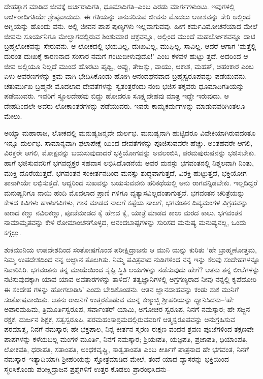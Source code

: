 ದೇಹತ್ಯಾಗ ಮಾಡಿದ ಜೀವಕ್ಕೆ ಅರ್ಚಿರಾದಿಗತಿ, ಧೂಮಾದಿಗತಿ–ಎಂಬ ಎರಡು ಮಾರ್ಗಗಳುಂಟು. ಇವುಗಳಲ್ಲಿ ಅರ್ಚಿರಾದಿಗತಿಯೇ ಶ್ರೇಷ್ಠವಾದುದು. ಈ ಗತಿಯನ್ನು ಅನುಸರಿಸುವ ಜೀವನು ಮೊದಲು ಆಕಾಶವನ್ನು ಸೇರಿ ಅಲ್ಲಿಂದ ಅಗ್ನಿಯನ್ನು ಹೊಂದು ವನು. ಅಲ್ಲಿ ಜೀವನ ಪಾಪ ಪುಣ್ಯಗಳು ಇಲ್ಲವಾಗುವವು. ಹೀಗೆ ಕರ್ಮವಿಮೋಚನೆಯಾದ ಮೇಲೆ ಜೀವನು ಸೂರ್ಯನಿಗೂ ಮೇಲ್ಭಾಗದಲ್ಲಿರುವ ಶಿಂಶುಮಾರ ಚಕ್ರವನ್ನೂ, ಅಲ್ಲಿಂದ ಮುಂದೆ ಮಹರ್ಲೋಕವನ್ನೂ ದಾಟಿ ಬ್ರಹ್ಮಲೋಕವನ್ನು ಸೇರುವನು. ಆ ಲೋಕದಲ್ಲಿ ಭಯವಿಲ್ಲ, ದುಃಖವಿಲ್ಲ, ಮುಪ್ಪಿಲ್ಲ, ಸಾವಿಲ್ಲ. ಆದರೆ ಆಗಾಗ ‘ಮತ್ತೆಲ್ಲಿ ದುರಂತ ದುಃಖಕ್ಕೆ ಕಾರಣನಾದ ಸಂಸಾರ ನಮಗೆ ಗಂಟುಬೀಳುವುದೊ!’ ಎಂಬ ಕಳವಳ ಹುಟ್ಟು ತ್ತದೆ. ಅದರಿಂದ ಆ ಜೀವ ಅಲ್ಲಿಯೂ ನಿಲ್ಲದೆ ಮುಂದೆ ಹೊರಟು ಪೃಥ್ವಿ, ಅಪ್ಪು, ತೇಜಸ್ಸು, ವಾಯು, ಆಕಾಶ, ಮಹತ್, ಅಹಂಕಾರ ಎಂಬ ಏಳು ಆವರಣಗಳನ್ನು ಕ್ರಮ ವಾಗಿ ಭೇದಿಸಿಕೊಂಡು ಹೋಗಿ ಆನಂದಘನವಾದ ಬ್ರಹ್ಮಸ್ವರೂಪವನ್ನು ಪಡೆಯುವನು. ಚತುರ್ಮುಖ ಬ್ರಹ್ಮನೇ ಮೊದಲಾದ ದೇವತೆಗಳನ್ನು ಸ್ವತಂತ್ರರೆಂದು ನಂಬಿ ಭಜಿಸ ತಕ್ಕವರು ಧೂಮಾದಿಗತಿಯನ್ನು ಪಡೆಯುವರು. ಇವರಿಗೆ ಸ್ಥೂಲದೇಹವು ಬಿದ್ದು ಹೋದರೂ ಸೂಕ್ಷ್ಮದೇಹವು ಮಾತ್ರ ಇದ್ದೇ ಇರುವುದು. ಆ ದೇಹದಿಂದಲೇ ಅವರು ಲೋಕಾಂತರಗಳನ್ನು ಪಡೆಯುವರು. ಇವರು ಕಾಮ್ಯಕರ್ಮಗಳನ್ನು ಮಾಡುವವರಿಗಿಂತಲೂ ಮೇಲು.

ಅಯ್ಯಾ ಮಹಾರಾಜ, ಲೋಕದಲ್ಲಿ ಮನುಷ್ಯಜನ್ಮವೇ ದುರ್ಲಭ. ಮನುಷ್ಯನಾಗಿ ಹುಟ್ಟಿದರೂ ವಿವೇಕಿಯಾಗಿರುವದಂತೂ ಇನ್ನೂ ದುರ್ಲಭ. ಸಾಮಾನ್ಯವಾಗಿ ಫಲಾಪೇಕ್ಷೆ ಯಿಂದ ದೇವತೆಗಳನ್ನು ಪೂಜಿಸುವವರೇ ಹೆಚ್ಚು. ಅಂತಹವರೇ ಆಗಲಿ, ವಿರಕ್ತರೇ ಆಗಲಿ, ಮೋಕ್ಷವನ್ನು ಬಯಸುವುದಾದರೆ ಭಕ್ತಿಯೋಗವನ್ನು ಅವಲಂಬಿಸಿ, ಪರಮಪುರುಷನನ್ನು ಭಜಿಸಬೇಕು. ಹಾಗೆ ಭಜಿಸುವವರಿಗೆ ಭಗವದ್ಭಕ್ತರ ಸಹವಾಸ ಲಭಿಸಿದೊಡನೆಯೆ ಅವರ ಮನಸ್ಸು ಭಗವಂತನಲ್ಲಿ ನಿಶ್ಚಲವಾಗಿ ನಿಂತು, ಮುಕ್ತಿ ದೊರೆಯುತ್ತದೆ. ಭಗವಂತನ ಸಂಕೀರ್ತನದಿಂದ ಮನಸ್ಸು ಶುದ್ಧವಾಗುತ್ತದೆ, ವಿರಕ್ತಿ ಹುಟ್ಟುತ್ತದೆ, ಭಕ್ತಿಯೋಗ ತಾನಾಗಿಯೇ ಲಭಿಸುತ್ತದೆ. ಆದ್ದರಿಂದ ಸುಖವನ್ನು ಬಯಸುವವನು ಹರಿಕಥೆಯಲ್ಲಿ ಅನು ರಾಗವನ್ನಿಡಬೇಕು. ಇಲ್ಲದಿದ್ದರೆ ಮನುಷ್ಯನಿಗೂ ನಾಯಿ ಹಂದಿ ಮೊದಲಾದ ಪ್ರಾಣಿ ಗಳಿಗೂ ವ್ಯತ್ಯಾಸವಿಲ್ಲದಂತಾಗುತ್ತದೆ. ಭಗವಂತನ ಚರಿತ್ರೆಯನ್ನು ಕೇಳದ ಕಿವಿಗಳು ಹಾಳುಗವಿಗಳು, ಗಾನ ಮಾಡದ ನಾಲಗೆ ಕಪ್ಪೆಯ ನಾಲಗೆ, ಭಗವಂತನ ದಿವ್ಯಮಂಗಳ ವಿಗ್ರಹವನ್ನು ಕಾಣದ ಕಣ್ಣು ನವಿಲಕಣ್ಣು, ಪೂಜೆಮಾಡದ ಕೈ ಹೆಣದ ಕೈ, ಯಾತ್ರೆ ಮಾಡದ ಕಾಲು ಮರದ ಕಾಲು. ಭಗವಂತನ ನಾಮಾಮೃತವನ್ನು ಕೇಳಿ ರೋಮಾಂಚನಗೊಳ್ಳದ, ಆನಂದಬಾಷ್ಪಗಳನ್ನು ಸುರಿಸದ ಮನುಷ್ಯ ಮನುಷ್ಯನಲ್ಲ, ಒಂದು ಕಗ್ಗಲ್ಲು.

ಶುಕಮುನಿಯ ಉಪದೇಶದಿಂದ ಸಂತೋಷಗೊಂಡ ಪರೀಕ್ಷಿದ್ರಾಜನು ಆ ಮುನಿ ಯನ್ನು ಕುರಿತು ‘ಹೇ ಬ್ರಾಹ್ಮಣೋತ್ತಮ, ನಿಮ್ಮ ಉಪದೇಶದಿಂದ ನನ್ನ ಅಜ್ಞಾನ ತೊಲಗಿತು. ನಿಮ್ಮ ಪವಿತ್ರವಾದ ನುಡಿಗಳಿಂದ ನನ್ನ ಇನ್ನು ಕೆಲವು ಸಂದೇಹಗಳನ್ನೂ ನಿವಾರಿಸಿರಿ. ಭಗವಂತನು ತನ್ನ ಮಾಯೆಯಿಂದ ಸೃಷ್ಟಿ ಸ್ಥಿತಿ ಲಯಗಳನ್ನು ನಡೆಸುವುದು ಹೇಗೆ? ಆತನು ತನ್ನ ಲೀಲೆಗಳನ್ನು ನಟಿಸುವುದಕ್ಕಾಗಿ ಯಾವ ಯಾವ ಅವತಾರಗಳನ್ನು ತಾಳಿದ? ತತ್ವಜ್ಞಾನಿಗಳಲ್ಲಿ ಅಗ್ರಗಣ್ಯರಾದ ನೀವು ನನ್ನಲ್ಲಿ ಕೃಪೆದೋರಿ ಈ ಸಂದೇಹ ಗಳನ್ನು ಹೋಗಲಾಡಿಸಿ’ ಎಂದು ಬೇಡಿಕೊಂಡನು. ಆತನ ಜ್ಞಾನದಾಹವನ್ನು ಕಂಡು ಶುಕ ಮುನಿಗೆ ಸಂತೋಷವಾಯಿತು. ಆತನು ರಾಜನಿಗೆ ಉತ್ತರಕೊಡುವ ಮುನ್ನ ಕಣ್ಮುಚ್ಚಿ ಶ್ರೀಹರಿಯನ್ನು ಧ್ಯಾನಿಸಿದನು–‘ಹೇ ಅಪಾರಮಹಿಮ, ತ್ರಿಮೂರ್ತಿಸ್ವರೂಪ, ಸರ್ವಾಂತರ್ ಯಾಮಿ, ಅಗೋಚರ ಸ್ವರೂಪ, ನಿನಗೆ ನಮಸ್ಕಾರ; ಹೇ ಸಜ್ಜನ ರಕ್ಷಕ, ದುರ್ಜನ ಶಿಕ್ಷಕ, ಸತ್ವಸ್ವರೂಪಿ, ಪರಮಹಂಸಾಶ್ರಮದಲ್ಲಿರುವವರಿಗೆ ಆತ್ಮಸ್ವರೂಪವನ್ನು ಅನುಗ್ರಹಿಸುವ ಪರಮಾತ್ಮ, ನಿನಗೆ ನಮಸ್ಕಾರ; ಹೇ ಭಕ್ತಪಾಲ, ನಿನ್ನ ಕೀರ್ತನ ಸ್ಮರಣ ಈಕ್ಷಣ ವಂದನ ಶ್ರವಣ ಪೂಜೆಗಳಿಂದ ತಕ್ಷಣವೇ ಪಾಪಗಳನ್ನು ಕಳೆಯಬಲ್ಲ ಮಂಗಳ ಮೂರ್ತಿ, ನಿನಗೆ ನಮಸ್ಕಾರ; ಶ್ರಿಯಃಪತಿ, ಯಜ್ಞಪತಿ, ಪ್ರಜಾಪತಿ, ಧಿಯಾಂಪತಿ, ಲೋಕಪತಿ, ಧರಾಪತಿ, ಸತಾಂಪತಿ, ಅಂಧಕವೃಷ್ಣಿ, ಸಾತ್ವತಾಂಪತಿ ಎಂಬ ಕೀರ್ತಿಗೆ ಪಾತ್ರನಾದ ಹೇ ಭಗವಂತ, ನಿನಗೆ ನಮಸ್ಕಾರ–ಇತ್ಯಾದಿಯಾಗಿ ಶ್ರೀಹರಿಯನ್ನು ಸ್ತೋತ್ರಮಾಡಿದ ಮೇಲೆ, ತಂದೆ ಯಾದ ವ್ಯಾಸರನ್ನು ಭಕ್ತಿಯಿಂದ ಸ್ಮರಿಸಿಕೊಂಡು ಪರೀಕ್ಷಿದ್ರಾಜನ ಪ್ರಶ್ನೆಗಳಿಗೆ ಉತ್ತರ ಕೊಡಲು ಪ್ರಾರಂಭಿಸಿದನು–

